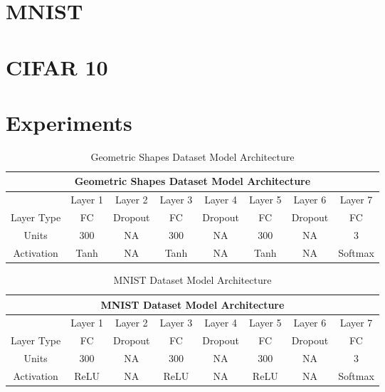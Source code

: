 \section{MNIST}

\section{CIFAR 10}


\section{Experiments}

\begin{table}[h]
\caption{Geometric Shapes Dataset Model Architecture} \label{tab:GeoArchitecture}
\begin{tabular}{|c||c|c|c|c|c|c|c|}
\hline
\multicolumn{8}{|c|}{Geometric Shapes Dataset Model Architecture} \\
\hline
 & Layer 1 & Layer 2 & Layer 3& Layer 4 &Layer 5 & Layer 6 & Layer 7 \\
\hline
\hline
Layer Type & FC & Dropout & FC & Dropout & FC & Dropout  & FC \\
\hline
Units & 300 & NA & 300 & NA & 300 & NA & 3 \\
\hline
Activation & Tanh & NA & Tanh & NA & Tanh & NA & Softmax \\
\hline
\end{tabular}
\end{table}

\begin{table}[h]
\caption{MNIST Dataset Model Architecture} \label{tab:MNISTArchitecture}
\begin{tabular}{|c||c|c|c|c|c|c|c|}
\hline
\multicolumn{8}{|c|}{MNIST Dataset Model Architecture} \\
\hline
 & Layer 1 & Layer 2 & Layer 3& Layer 4 &Layer 5 & Layer 6 & Layer 7 \\
\hline
\hline
Layer Type & FC & Dropout & FC & Dropout & FC & Dropout  & FC \\
\hline
Units & 300 & NA & 300 & NA & 300 & NA & 3 \\
\hline
Activation & ReLU & NA & ReLU & NA & ReLU & NA & Softmax \\
\hline
\end{tabular}
\end{table}

